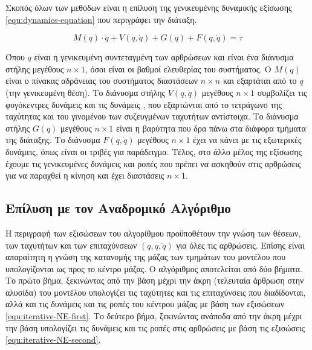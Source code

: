 Σκοπός όλων των μεθόδων είναι η επίλυση της γενικευμένης δυναμικής εξίσωσης \ref{equ:dynamics-equation} που περιγράφει την διάταξη.

\begin{equation}
    M(q) \cdot \ddot{q} + V(q, \dot{q}) + G(q) + F(q, \dot{q}) = \tau
    \label{equ:dynamics-equation}
\end{equation}

Όπου $q$ είναι η γενικευμένη συντεταγμένη των αρθρώσεων και είναι ένα διάνυσμα στήλης μεγέθους $n \times 1$, όσοι είναι οι βαθμοί ελευθερίας του συστήματος. Ο $M(q)$ είναι ο πίνακας αδράνειας του συστήματος διαστάσεων $n \times n$ και εξαρτάται από το $q$ (την γενικευμένη θέση). Το διάνυσμα στήλης $V(q, \dot{q})$ μεγέθους $n \times 1$ συμβολίζει τις φυγόκεντρες δυνάμεις και τις δυνάμεις , που εξαρτώνται από το τετράγωνο της ταχύτητας και του γινομένου των συζευγμένων ταχυτήτων αντίστοιχα. Το διάνυσμα στήλης $G(q)$ μεγέθους $n \times 1$ είναι η βαρύτητα που δρα πάνω στα διάφορα τμήματα της διάταξης. Το διάνυσμα $F(q, \dot{q})$ μεγέθους $n \times 1$ έχει να κάνει με τις εξωτερικές δυνάμεις, όπως είναι οι τριβές για παράδειγμα. Τέλος, στο άλλο μέλος της εξίσωσης έχουμε τις γενικευμένες δυνάμεις και ροπές που πρέπει να ασκηθούν στις αρθρώσεις για να παραχθεί η κίνηση και έχει διαστάσεις $n \times 1$.

\subsection{Επίλυση με τον Αναδρομικό Αλγόριθμο}

Η περιγραφή των εξισώσεων του αλγορίθμου  προϋποθέτουν την γνώση των θέσεων, των ταχυτήτων και των επιταχύνσεων $(q, \dot{q}, \ddot{q})$ για όλες τις αρθρώσεις. Επίσης είναι απαραίτητη η γνώση της κατανομής της μάζας των τμημάτων του μοντέλου που υπολογίζονται ως προς το κέντρο μάζας. Ο αλγόριθμος αποτελείται από δύο βήματα. Το πρώτο βήμα, ξεκινώντας από την βάση μέχρι την άκρη (τελευταία άρθρωση στην αλυσίδα) του μοντέλου υπολογίζει τις ταχύτητες και τις επιταχύνσεις που διαδίδονται, αλλά και τις δυνάμεις και τις ροπές του κέντρου μάζας με βάση των εξισώσεων \ref{equ:iterative-NE-first}. Το δεύτερο βήμα, ξεκινώντας ανάποδα από την άκρη μέχρι την βάση υπολογίζει τις δυνάμεις και τις ροπές στις αρθρώσεις με βάση τις εξισώσεις \ref{equ:iterative-NE-second}.

